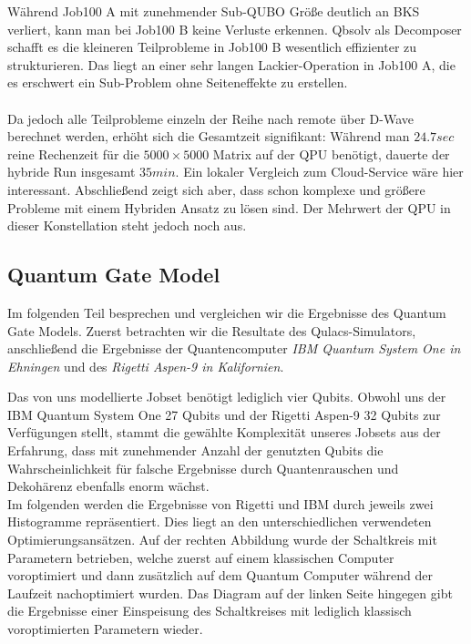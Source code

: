 Während Job100 A mit zunehmender Sub-QUBO Größe deutlich an BKS verliert, kann man bei Job100 B keine Verluste erkennen. Qbsolv als Decomposer schafft es die kleineren Teilprobleme in Job100 B wesentlich effizienter zu strukturieren. Das liegt an einer sehr langen Lackier-Operation in Job100 A, die es erschwert ein Sub-Problem ohne Seiteneffekte zu erstellen.\\\\
Da jedoch alle Teilprobleme  einzeln der Reihe nach remote über D-Wave berechnet werden, erhöht sich die  Gesamtzeit signifikant: Während man $24.7 sec$ reine Rechenzeit für die  $5000 \times 5000$ Matrix  auf der QPU  benötigt, dauerte der hybride Run insgesamt $35 min$. Ein lokaler Vergleich zum Cloud-Service wäre hier interessant. Abschließend zeigt sich aber, dass schon komplexe und größere Probleme mit einem Hybriden Ansatz zu lösen sind. Der Mehrwert der QPU in dieser Konstellation steht jedoch noch aus.

\subsection{Quantum Gate Model}
\label{subsec:qgm}
Im folgenden Teil besprechen und vergleichen wir die Ergebnisse des Quantum Gate Models. Zuerst betrachten wir die Resultate des Qulacs-Simulators, anschließend die Ergebnisse der Quantencomputer \textit{IBM Quantum System One in Ehningen} und des \textit{Rigetti Aspen-9 in Kalifornien}.

Das von uns modellierte Jobset benötigt lediglich vier Qubits. Obwohl uns der IBM Quantum System One 27 Qubits und der Rigetti Aspen-9 32 Qubits zur Verfügungen stellt, stammt die gewählte Komplexität unseres Jobsets aus der Erfahrung, dass mit zunehmender Anzahl der genutzten Qubits die Wahrscheinlichkeit für falsche Ergebnisse durch Quantenrauschen und Dekohärenz ebenfalls enorm wächst.\\
Im folgenden werden die Ergebnisse von Rigetti und IBM durch jeweils zwei Histogramme repräsentiert. Dies liegt an den unterschiedlichen verwendeten Optimierungsansätzen.
Auf der rechten Abbildung wurde der Schaltkreis mit Parametern betrieben, welche zuerst auf einem klassischen Computer voroptimiert und dann zusätzlich auf dem Quantum Computer während der Laufzeit nachoptimiert wurden. Das Diagram auf der linken Seite hingegen gibt die Ergebnisse einer Einspeisung des Schaltkreises mit lediglich klassisch voroptimierten Parametern wieder.

